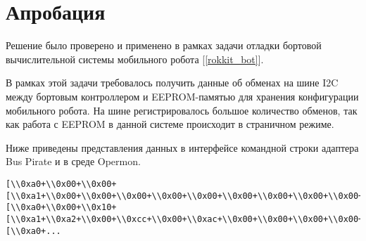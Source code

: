 \section{Апробация}

Решение было проверено и применено в рамках задачи отладки бортовой вычислительной системы мобильного робота [\ref{rokkit_bot}].

В рамках этой задачи требовалось получить данные об обменах на шине I2C между бортовым контроллером и EEPROM-памятью для хранения конфигурации мобильного робота. На шине регистрировалось большое количество обменов, так как работа с EEPROM в данной системе происходит в страничном режиме.

Ниже приведены представления данных в интерфейсе командной строки адаптера Bus Pirate и в среде Opermon.

\begin{lstlisting}[caption=Пример представления данных обменов в консольном интерфейсе Bus Pirate]
 [\\0xa0+\\0x00+\\0x00+[\\0xa1+\\0x00+\\0x00+\\0x00+\\0x00+\\0x00+\\0x00+\\0x00+\\0x00+\\0x00+\\0x00+\\0x00+\\0x00+\\0x00+\\0x00+\\0x00+\\0x00-][\\0xa0+\\0x00+\\0x10+[\\0xa1+\\0xa2+\\0x00+\\0xcc+\\0x00+\\0xac+\\0x00+\\0x00+\\0x00+\\0x00+\\0x00+\\0x00+\\0x00+\\0x00+\\0x00+\\0x00+\\0x00-][\\0xa0+...
\end{lstlisting}

